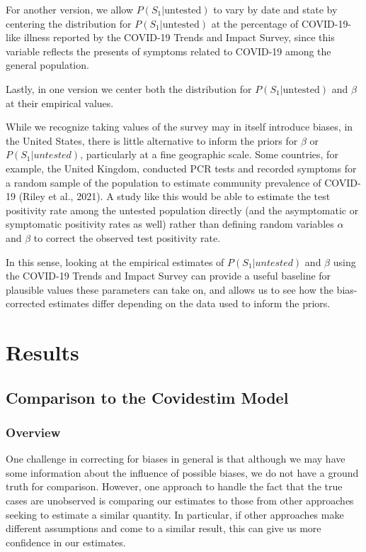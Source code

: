 \documentclass[12pt,twoside]{smiththesis}
\begin{document}
For another version, we allow \(P(S_1|\text{untested})\) to vary by date and state by centering the distribution for \(P(S_1|\text{untested})\) at the percentage of COVID-19-like illness reported by the COVID-19 Trends and Impact Survey, since this variable reflects the presents of symptoms related to COVID-19 among the general population.

Lastly, in one version we center both the distribution for \(P(S_1|\text{untested})\) and \(\beta\) at their empirical values.

While we recognize taking values of the survey may in itself introduce biases, in the United States, there is little alternative to inform the priors for \(\beta\) or \(P(S_1|untested)\), particularly at a fine geographic scale. Some countries, for example, the United Kingdom, conducted PCR tests and recorded symptoms for a random sample of the population to estimate community prevalence of COVID-19 (Riley et al., 2021). A study like this would be able to estimate the test positivity rate among the untested population directly (and the asymptomatic or symptomatic positivity rates as well) rather than defining random variables \(\alpha\) and \(\beta\) to correct the observed test positivity rate.

In this sense, looking at the empirical estimates of \(P(S_1|untested)\) and \(\beta\) using the COVID-19 Trends and Impact Survey can provide a useful baseline for plausible values these parameters can take on, and allows us to see how the bias-corrected estimates differ depending on the data used to inform the priors.

\hypertarget{res}{%
\chapter{Results}\label{res}}

\hypertarget{comparison-to-the-covidestim-model}{%
\section{Comparison to the Covidestim Model}\label{comparison-to-the-covidestim-model}}

\hypertarget{overview-2}{%
\subsection{Overview}\label{overview-2}}

One challenge in correcting for biases in general is that although we may have some information about the influence of possible biases, we do not have a ground truth for comparison. However, one approach to handle the fact that the true cases are unobserved is comparing our estimates to those from other approaches seeking to estimate a similar quantity. In particular, if other approaches make different assumptions and come to a similar result, this can give us more confidence in our estimates.
\end{document}
